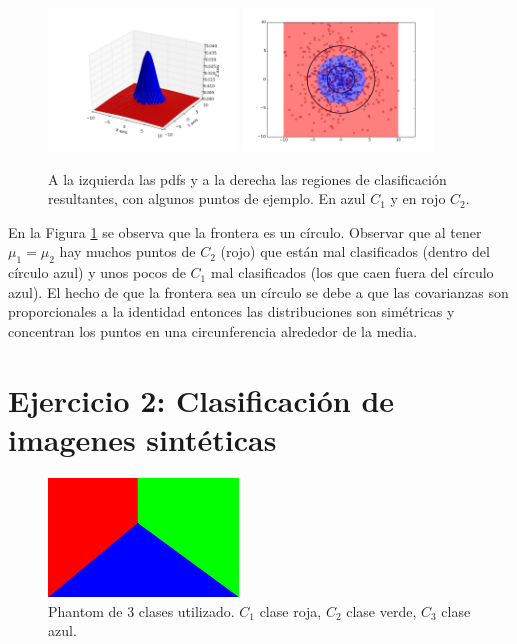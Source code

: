 \documentclass[a4paper,11pt]{article}
\begin{document}
\begin{figure}[h!]
\centering
\includegraphics[width=0.45\textwidth]{img/ej1-caso3c-pdf.png}
\includegraphics[width=0.45\textwidth]{img/ej1-caso3c-region.png}
\caption{A la izquierda las pdfs y a la derecha las regiones de clasificación resultantes, con algunos puntos de ejemplo. En azul $C_1$ y en rojo $C_2$.}
\label{ej1_caso3c}
\end{figure}

En la Figura \ref{ej1_caso3c} se observa que la frontera es un círculo. Observar que al tener $\mu_1 = \mu_2$ hay muchos puntos de $C_2$ (rojo) que están mal clasificados (dentro del círculo azul) y unos pocos de $C_1$ mal clasificados (los que caen fuera del círculo azul). El hecho de que la frontera sea un círculo se debe a que las covarianzas son proporcionales a la identidad entonces las distribuciones son simétricas y concentran los puntos en una circunferencia alrededor de la media.




\section{Ejercicio 2: Clasificación de imagenes sintéticas}

\begin{figure}
\centering
\includegraphics[width=0.45\textwidth]{img/phantomCustom.png}
\caption{Phantom de 3 clases utilizado. $C_1$ clase roja, $C_2$ clase verde, $C_3$ clase azul.}
\label{phantom}
\end{figure}
\end{document}
